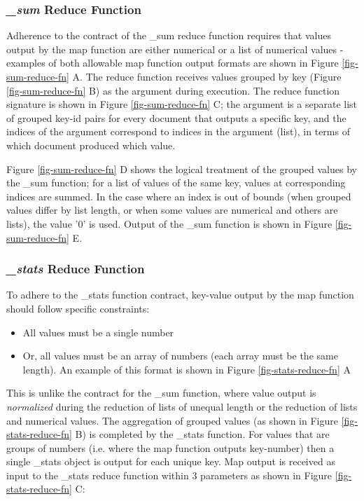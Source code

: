 \subsubsection{\textit{\_sum} Reduce Function}
Adherence to the contract of the \_sum reduce function requires that values output by the map function are either numerical or a list of numerical values - examples of both allowable map function output formats are shown in Figure \ref{fig-sum-reduce-fn} A. The reduce function receives values grouped by key (Figure \ref{fig-sum-reduce-fn} B) as the  argument during execution. The reduce function signature is shown in Figure \ref{fig-sum-reduce-fn} C; the  argument is a separate list of grouped key-id pairs for every document that outputs a specific key, and the indices of the  argument correspond to indices in the  argument (list), in terms of which document produced which value.

Figure \ref{fig-sum-reduce-fn} D shows the logical treatment of the grouped values by the \_sum function; for a list of values of the same key, values at corresponding indices are summed. In the case where an index is out of bounds (when grouped values differ by list length, or when some values are numerical and others are lists), the value '0' is used. Output of the \_sum function is shown in Figure \ref{fig-sum-reduce-fn} E.



\subsubsection{\textit{\_stats} Reduce Function}
To adhere to the \_stats function contract, key-value output by the map function should follow specific constraints:

\begin{itemize}
    \item All values must be a single number
    \item Or, all values must be an array of numbers (each array must be the same length). An example of this format is shown in Figure \ref{fig-stats-reduce-fn} A
\end{itemize}

This is unlike the contract for the \_sum function, where value output is \textit{normalized} during the reduction of lists of unequal length or the reduction of lists and numerical values. The aggregation of grouped values (as shown in Figure \ref{fig-stats-reduce-fn} B) is completed by the \_stats function. For values that are groups of numbers (i.e. where the map function outputs key-number) then a single \_stats object is output for each unique key. Map output is received as input to the \_stats reduce function within 3 parameters as shown in Figure \ref{fig-stats-reduce-fn} C:

